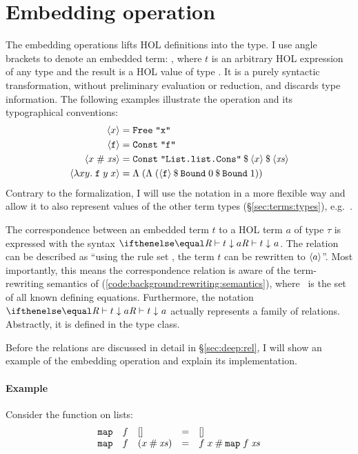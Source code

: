 
\section{Embedding operation}
\label{sec:deep:operation}

The embedding operations lifts HOL definitions into the  type.
I use angle brackets to denote an embedded term: , where $t$ is an arbitrary HOL expression of any type and the result  is a HOL value of type .
It is a purely syntactic transformation, without preliminary evaluation or reduction, and discards type information.
The following examples illustrate the operation and its typographical conventions:
%
\begin{align*}
  \left\langle x\right\rangle &= \texttt{\textup{Free}}\;\texttt{"x"} \\
  \left\langle\texttt{\textup{f}}\right\rangle &= \texttt{\textup{Const}}\;\texttt{"f"} \\
  \left\langle x\;\#\;\mathit{xs}\right\rangle &= \texttt{\textup{Const}}\;\texttt{"List.list.Cons"}\mathbin{\$}\left\langle x\right\rangle\mathbin{\$}\left\langle\mathit{xs}\right\rangle \\
  \left\langle\lambda x y.\; \texttt{\textup{f}}\;y\;x\right\rangle &= \Lambda\;(\Lambda\;(\left\langle\texttt{\textup{f}}\right\rangle\mathbin{\$}\texttt{\textup{Bound}}\; 0\mathbin{\$}\texttt{\textup{Bound}}\;1))
\end{align*}
%
\noindent
Contrary to the formalization, I will use the  notation in a more flexible way and allow it to also represent values of the other term types (§\ref{sec:terms:types}), e.g.\ .

The correspondence between an embedded term $t$ to a HOL term $a$ of type $\tau$ is expressed with the syntax $\evalr\R t a$.
The relation can be described as ``using the rule set \R, the term $t$ can be rewritten to $\left\langle a\right\rangle$''.
Most importantly, this means the correspondence relation is aware of the term-rewriting semantics of  (\cref{code:background:rewriting:semantics}), where \R\ is the set of all known defining equations.
Furthermore, the notation $\evalr\R t a$ actually represents a family of relations.
Abstractly, it is defined in the  type class.

Before the relations are discussed in detail in §\ref{sec:deep:rel}, I will show an example of the embedding operation and explain its implementation.

\paragraph{Example}
Consider the  function on lists:
\[
  \begin{array}{lllcl}
    \texttt{\textup{map}}&f&[] &=& [] \\
    \texttt{\textup{map}}&f&(x \mathbin{\mathtt{\#}} \mathit{xs}) &=& f\;x \mathbin{\mathtt{\#}} \texttt{\textup{map}}\;f\;\mathit{xs}
  \end{array}
\]

